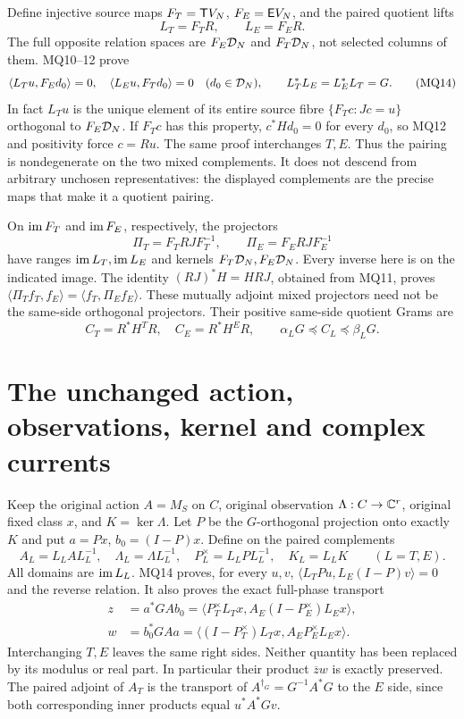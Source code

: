 \documentclass[11pt]{article}
\begin{document}
Define injective source maps $F_T=\mathsf T V_N$, $F_E=\mathsf E V_N$,
and the paired quotient lifts
\[
 L_T=F_TR,\qquad L_E=F_ER.                                  \tag{MQ13}
\]
The full opposite relation spaces are $F_E\mathcal D_N$ and
$F_T\mathcal D_N$, not selected columns of them. MQ10--12 prove
\[
 \langle L_Tu,F_Ed_0\rangle=0,
 \quad \langle L_Eu,F_Td_0\rangle=0\quad(d_0\in\mathcal D_N),
 \qquad L_T^*L_E=L_E^*L_T=G.                                \tag{MQ14}
\]
In fact $L_Tu$ is the unique element of its entire source fibre
$\{F_Tc:Jc=u\}$ orthogonal to $F_E\mathcal D_N$. If $F_Tc$ has this
property, $c^*Hd_0=0$ for every $d_0$, so MQ12 and positivity
force $c=Ru$. The same proof interchanges $T,E$. Thus the pairing
is nondegenerate on the two mixed complements. It does not descend
from arbitrary unchosen representatives: the displayed complements
are the precise maps that make it a quotient pairing.

On $\operatorname{im} F_T$ and $\operatorname{im} F_E$, respectively, the projectors
\[
 \Pi_T=F_TRJ F_T^{-1},\qquad \Pi_E=F_ERJ F_E^{-1}             \tag{MQ15}
\]
have ranges $\operatorname{im} L_T,\operatorname{im} L_E$ and kernels $F_T\mathcal D_N,F_E\mathcal D_N$.
Every inverse here is on the indicated image. The identity
$(RJ)^*H=HRJ$, obtained from MQ11, proves
$\langle\Pi_T f_T,f_E\rangle=\langle f_T,\Pi_E f_E\rangle$.
These mutually adjoint mixed projectors need not be the same-side
orthogonal projectors. Their positive same-side quotient Grams are
\[
 C_T=R^*H^TR,\quad C_E=R^*H^ER,\qquad
 \alpha_L G\preceq C_L\preceq\beta_LG.                      \tag{MQ16}
\]

\section{The unchanged action, observations, kernel and complex currents}
Keep the original action $A=M_S$ on $C$, original observation
$\Lambda:C\to\mathbb C^r$, original fixed class $x$, and $K=\ker\Lambda$.
Let $P$ be the $G$-orthogonal projection onto exactly $K$ and put
$a=Px$, $b_0=(I-P)x$. Define on the paired complements
\[
 A_L=L_LAL_L^{-1},\quad \Lambda_L=\Lambda L_L^{-1},\quad
 P_L^\times=L_LPL_L^{-1},\quad K_L=L_LK\qquad(L=T,E).
                                                               \tag{MQ17}
\]
All domains are $\operatorname{im} L_L$. MQ14 proves, for every $u,v$,
$\langle L_TPu,L_E(I-P)v\rangle=0$ and the reverse relation.
It also proves the exact full-phase transport
\[
 \begin{split}
 z&=a^*GA b_0
  =\langle P_T^\times L_Tx,A_E(I-P_E^\times)L_Ex\rangle,\\
 w&=b_0^*GA a
  =\langle(I-P_T^\times)L_Tx,A_EP_E^\times L_Ex\rangle.
 \end{split}                                                  \tag{MQ18}
\]
Interchanging $T,E$ leaves the same right sides. Neither quantity
has been replaced by its modulus or real part. In particular their
product $\overline zw$ is exactly preserved. The paired adjoint of
$A_T$ is the transport of $A^{\dagger_G}=G^{-1}A^*G$ to the
$E$ side, since both corresponding inner products equal
$u^*A^*Gv$.
\end{document}
